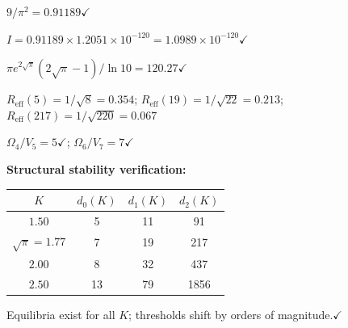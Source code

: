 \documentclass[11pt,a4paper]{article}
\begin{document}
$9/\pi^2 = 0.91189$\;$\checkmark$

$I = 0.91189\times 1.2051\times 10^{-120}
= 1.0989\times 10^{-120}$\;$\checkmark$

$\pi e^{2\sqrt{\pi}}(2\sqrt{\pi}-1)/\ln 10 = 120.27$\;$\checkmark$

$R_{\mathrm{eff}}(5) = 1/\sqrt{8} = 0.354$\;;\quad
$R_{\mathrm{eff}}(19) = 1/\sqrt{22} = 0.213$\;;\quad
$R_{\mathrm{eff}}(217) = 1/\sqrt{220} = 0.067$

$\Omega_4/V_5 = 5$\;$\checkmark$\;;\quad
$\Omega_6/V_7 = 7$\;$\checkmark$

\textbf{Structural stability verification:}

\begin{center}
\begin{tabular}{cccc}
\toprule
$K$ & $d_0(K)$ & $d_1(K)$ & $d_2(K)$ \\
\midrule
$1.50$ & 5 & 11 & 91 \\
$\sqrt{\pi} = 1.77$ & 7 & 19 & 217 \\
$2.00$ & 8 & 32 & 437 \\
$2.50$ & 13 & 79 & 1856 \\
\bottomrule
\end{tabular}
\end{center}

Equilibria exist for all $K$; thresholds shift by orders of
magnitude.\;$\checkmark$
\end{document}

